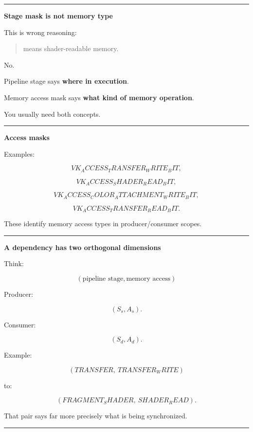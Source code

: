 \begin{center}\rule{0.5\linewidth}{0.5pt}\end{center}

\textbf{Stage mask is not memory type}

This is wrong reasoning:

\begin{quote}
 means shader-readable memory.
\end{quote}

No.

Pipeline stage says \textbf{where in execution}.

Memory access mask says \textbf{what kind of memory operation}.

You usually need both concepts.

\begin{center}\rule{0.5\linewidth}{0.5pt}\end{center}

\textbf{Access masks}

Examples:

\[
VK_ACCESS_TRANSFER_WRITE_BIT,
\]

\[
VK_ACCESS_SHADER_READ_BIT,
\]

\[
VK_ACCESS_COLOR_ATTACHMENT_WRITE_BIT,
\]

\[
VK_ACCESS_TRANSFER_READ_BIT.
\]

These identify memory access types in producer/consumer scopes.

\begin{center}\rule{0.5\linewidth}{0.5pt}\end{center}

\textbf{A dependency has two orthogonal dimensions}

Think:

\[
\boxed{
(\text{pipeline stage},\text{memory access})
}
\]

Producer:

\[
(S_s,A_s).
\]

Consumer:

\[
(S_d,A_d).
\]

Example:

\[
(TRANSFER,\ TRANSFER_WRITE)
\]

to:

\[
(FRAGMENT_SHADER,\ SHADER_READ).
\]

That pair says far more precisely what is being synchronized.

\begin{center}\rule{0.5\linewidth}{0.5pt}\end{center}

